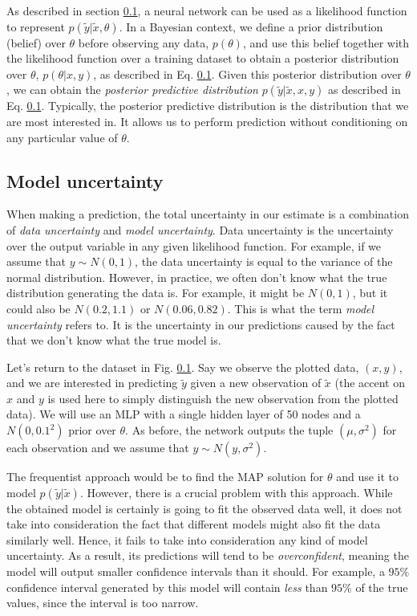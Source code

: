 \documentclass[12pt]{article}
\begin{document}
As described in section \ref{}, a neural network can be used as a likelihood function to represent $p(\tilde{y} | \tilde{x}, \theta)$. In a Bayesian context, we define a prior distribution (belief) over $\theta$ before observing any data, $p(\theta)$, and use this belief together with the likelihood function over a training dataset to obtain a posterior distribution over $\theta$, $p(\theta | x, y)$, as described in Eq. \ref{}. Given this posterior distribution over $\theta$, we can obtain the \textit{posterior predictive distribution} $p(\tilde{y} | \tilde{x}, x, y)$ as described in Eq. \ref{}. Typically, the posterior predictive distribution is the distribution that we are most interested in. It allows us to perform prediction without conditioning on any particular value of $\theta$.

\subsection{Model uncertainty}

When making a prediction, the total uncertainty in our estimate is a combination of \textit{data uncertainty} and \textit{model uncertainty}. Data uncertainty is the uncertainty over the output variable in any given likelihood function. For example, if we assume that $y \sim N(0, 1)$, the data uncertainty is equal to the variance of the normal distribution. However, in practice, we often don't know what the true distribution generating the data is. For example, it might be $N(0, 1)$, but it could also be $N(0.2, 1.1)$ or $N(0.06, 0.82)$. This is what the term \textit{model uncertainty} refers to. It is the uncertainty in our predictions caused by the fact that we don't know what the true model is.

Let's return to the dataset in Fig. \ref{}. Say we observe the plotted data, $(x, y)$, and we are interested in predicting $\tilde{y}$ given a new observation of $\tilde{x}$ (the accent on $x$ and $y$ is used here to simply distinguish the new observation from the plotted data). We will use an MLP with a single hidden layer of 50 nodes and a $N(0, 0.1^2)$ prior over $\theta$. As before, the network outputs the tuple $(\mu, \sigma^2)$ for each observation and we assume that $y \sim N(y, \sigma^2)$.

The frequentist approach would be to find the MAP solution for $\theta$ and use it to model $p(\tilde{y} | \tilde{x})$. However, there is a crucial problem with this approach. While the obtained model is certainly is going to fit the observed data well, it does not take into consideration the fact that different models might also fit the data similarly well. Hence, it fails to take into consideration any kind of model uncertainty. As a result, its predictions will tend to be \textit{overconfident}, meaning the model will output smaller confidence intervals than it should. For example, a $95\%$ confidence interval generated by this model will contain \textit{less} than $95\%$ of the true values, since the interval is too narrow.
\end{document}
